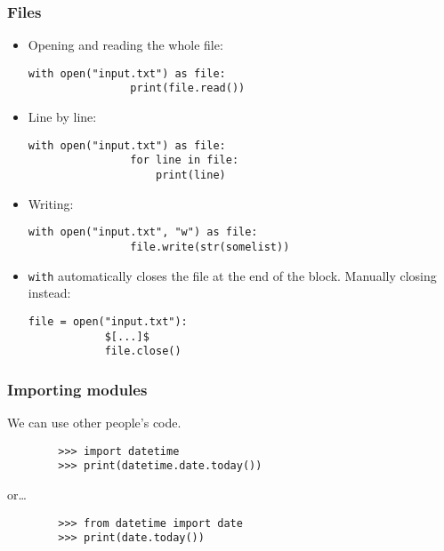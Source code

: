 \documentclass[notes]{beamer}
\begin{document}
	\begin{frame}[fragile]
		\frametitle{Files}
		
		\begin{itemize}
			\item Opening and reading the whole file:
			\begin{lstlisting}[xleftmargin=\dimexpr-\leftmargini]
			with open("input.txt") as file:
			    print(file.read())
			\end{lstlisting}
			
			\pause
			
			\item Line by line:
			\begin{lstlisting}[xleftmargin=\dimexpr-\leftmargini]
			with open("input.txt") as file:
			    for line in file:
			        print(line)
			\end{lstlisting}
			
			\pause
			
			\item Writing:
			\begin{lstlisting}[xleftmargin=\dimexpr-\leftmargini]
			with open("input.txt", "w") as file:
			    file.write(str(somelist))
			\end{lstlisting}
			
			\pause
			
			\item \lstinline|with| automatically closes the file at the end of the block. Manually closing instead:
			
			\begin{lstlisting}[xleftmargin=\dimexpr-\leftmargini]
			file = open("input.txt"):
			$[...]$
			file.close()
			\end{lstlisting}
		\end{itemize}
	\end{frame}
	
	\begin{frame}[fragile]
		\frametitle{Importing modules}
		We can use other people's code.
		\begin{lstlisting}
		>>> import datetime
		>>> print(datetime.date.today())
		\end{lstlisting}
		\pause
		or\dots
		\begin{lstlisting}
		>>> from datetime import date
		>>> print(date.today())
		\end{lstlisting}
	\end{frame}
\end{document}
